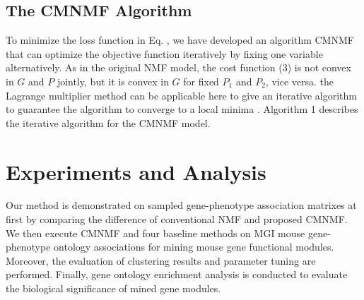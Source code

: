 \documentclass{bmcart}
\begin{document}
\subsection*{The CMNMF Algorithm}
To minimize the loss function in Eq. , we have developed an algorithm CMNMF that can optimize the objective function iteratively by fixing one variable alternatively. As in the original NMF model, the cost function (3) is not convex in $G$ and $P$ jointly, but it is convex in $G$ for fixed $P_1$ and $P_2$, vice versa. the Lagrange multiplier method can be applicable here to give an iterative algorithm to guarantee the algorithm to converge to a local minima \cite{document_cluster_NMF}. Algorithm 1 describes the iterative algorithm for the CMNMF model.

\section*{Experiments and Analysis}
Our method is demonstrated on sampled gene-phenotype association matrixes at first by comparing the difference of conventional NMF and proposed CMNMF. We then execute CMNMF and four baseline methods on MGI mouse gene-phenotype ontology associations for mining mouse gene functional modules. Moreover, the evaluation of clustering results and parameter tuning are performed. Finally, gene ontology enrichment analysis is conducted to evaluate the biological significance of mined gene modules.
\end{document}
